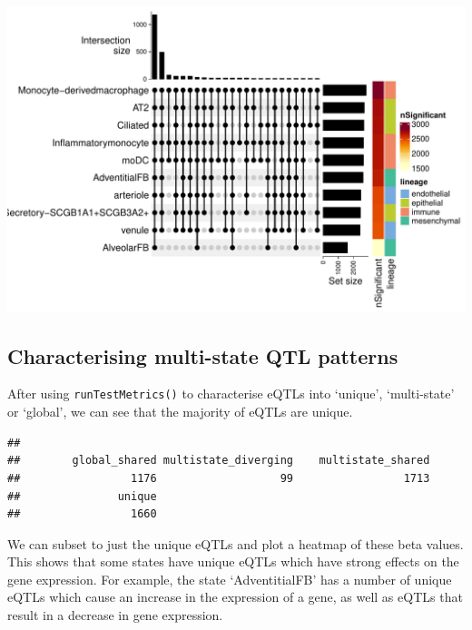 \documentclass[
]{article}
\newenvironment{Shaded}{\begin{snugshade}}{\end{snugshade}}
\newcommand{\FunctionTok}[1]{\textcolor[rgb]{0.13,0.29,0.53}{\textbf{#1}}}
\newcommand{\NormalTok}[1]{#1}
\newcommand{\OtherTok}[1]{\textcolor[rgb]{0.56,0.35,0.01}{#1}}
\newcommand{\SpecialCharTok}[1]{\textcolor[rgb]{0.81,0.36,0.00}{\textbf{#1}}}
\begin{document}
\includegraphics{Chapter_5_Analysis_files/figure-latex/plot-upset-lung-1.pdf}
\normalsize

\hypertarget{characterising-multi-state-qtl-patterns}{%
\subsection{Characterising multi-state QTL
patterns}\label{characterising-multi-state-qtl-patterns}}

After using \texttt{runTestMetrics()} to characterise eQTLs into
`unique', `multi-state' or `global', we can see that the majority of
eQTLs are unique. \footnotesize

\begin{Shaded}
\end{Shaded}

\begin{verbatim}
## 
##        global_shared multistate_diverging    multistate_shared 
##                 1176                   99                 1713 
##               unique 
##                 1660
\end{verbatim}

\normalsize
\footnotesize

\normalsize

We can subset to just the unique eQTLs and plot a heatmap of these beta
values. This shows that some states have unique eQTLs which have strong
effects on the gene expression. For example, the state `AdventitialFB'
has a number of unique eQTLs which cause an increase in the expression
of a gene, as well as eQTLs that result in a decrease in gene
expression.
\end{document}
